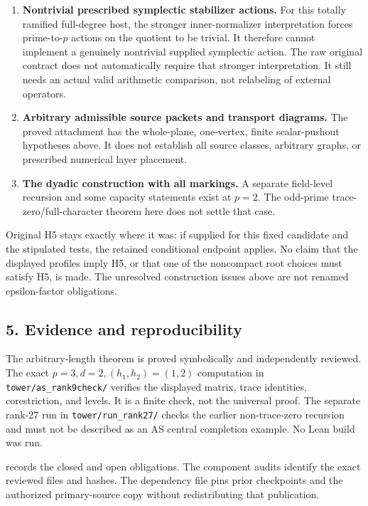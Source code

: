 \begin{enumerate}
\def\labelenumi{\arabic{enumi}.}
\tightlist
\item
  \textbf{Nontrivial prescribed symplectic stabilizer actions.} For this
  totally ramified full-degree host, the stronger inner-normalizer
  interpretation forces prime-to-\(p\) actions on the quotient to be
  trivial. It therefore cannot implement a genuinely nontrivial supplied
  symplectic action. The raw original contract does not automatically
  require that stronger interpretation. It still needs an actual valid
  arithmetic comparison, not relabeling of external operators.
\item
  \textbf{Arbitrary admissible source packets and transport diagrams.}
  The proved attachment has the whole-plane, one-vertex, finite
  scalar-pushout hypotheses above. It does not establish all source
  classes, arbitrary graphs, or prescribed numerical layer placement.
\item
  \textbf{The dyadic construction with all markings.} A separate
  field-level recursion and some capacity statements exist at \(p=2\).
  The odd-prime trace-zero/full-character theorem here does not settle
  that case.
\end{enumerate}

Original H5 stays exactly where it was: if supplied for this fixed
candidate and the stipulated tests, the retained conditional endpoint
applies. No claim that the displayed profiles imply H5, or that one of
the noncompact root choices must satisfy H5, is made. The unresolved
construction issues above are not renamed epsilon-factor obligations.

\hypertarget{odd_synthesis-evidence-and-reproducibility}{%
\subsection{5. Evidence and
reproducibility}\label{odd_synthesis-evidence-and-reproducibility}}

The arbitrary-length theorem is proved symbolically and independently
reviewed. The exact \(p=3,d=2,(h_1,h_2)=(1,2)\) computation in
\texttt{tower/as\_rank9check/} verifies the displayed matrix, trace
identities, corestriction, and levels. It is a finite check, not the
universal proof. The separate rank-27 run in \texttt{tower/run\_rank27/}
checks the earlier non-trace-zero recursion and must not be described as
an AS central completion example. No Lean build was run.

 records the closed and open obligations. The
component audits identify the exact reviewed files and hashes. The
dependency file pins prior checkpoints and the authorized primary-source
copy without redistributing that publication.
